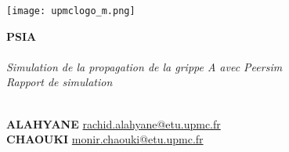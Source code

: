 \begin{titlepage}
	\begin{flushleft}
		\vspace{3mm}
		\texttt{[image: upmclogo\_m.png]}\\
	\end{flushleft}
	\vfil
	\vfil
	
	\begin{center}
		\Huge\textbf{{PSIA}}\\
		\hrulefill\\
		\Huge\textit{{Simulation de la propagation de la grippe A avec Peersim}}\\
		\emph{Rapport de simulation}
	\end{center}
	\hrulefill\\
	\vfil
	\noindent \textbf{ALAHYANE} 
	\hfill 
	\href{mailto:rachid.alahyane@etu.upmc.fr}{rachid.alahyane@etu.upmc.fr}\\ 
	\textbf{CHAOUKI} 
	\hfill 
	\href{mailto:monir.chaouki@etu.upmc.fr}{monir.chaouki@etu.upmc.fr}\\
        \vfil
	\begin{center}	
	\end{center}
\end{titlepage}




